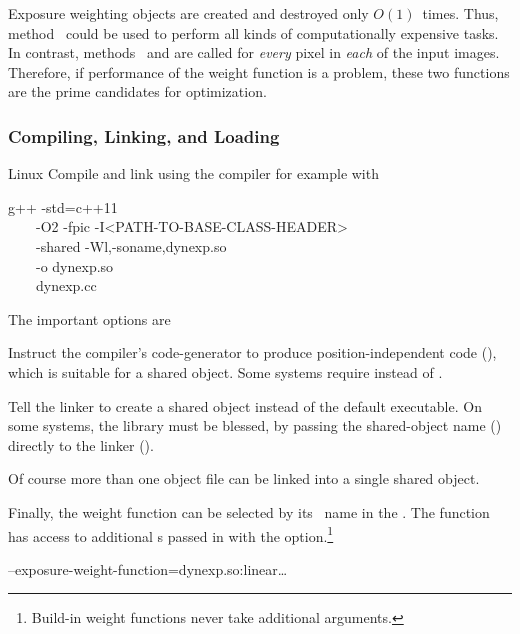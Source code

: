Exposure weighting objects are created and destroyed only $O(1)$~times.  Thus,
method~ could be used to perform all kinds of computationally expensive tasks.
In contrast, methods~ and  are called for \emph{every} pixel in
\emph{each} of the input images.  Therefore, if performance of the weight function is a problem,
these two functions are the prime candidates for optimization.


\subsubsection[Compiling, Linking, and Loading]{\label{sec:compiling-linking-loading}%
  Compiling, Linking, and Loading}

\begin{restrictedmaterial}{Linux}
  \noindent Compile and link using the  compiler for example with

  \begin{literal}
    g++ -std=c++11 \bslash \\
    ~~~~-O2 -fpic -I<PATH-TO-BASE-CLASS-HEADER> \bslash \\
    ~~~~-shared -Wl,-soname,dynexp.so \bslash \\
    ~~~~-o dynexp.so \bslash \\
    ~~~~dynexp.cc
  \end{literal}

  The important options are

  \begin{codelist}
  \item[\option{-fpic}]\itemend
    Instruct the compiler's code-generator to produce position\hyp{}independent code
    (), which is suitable for a shared object.  Some systems require 
    instead of .

  \item[\option{-shared}]\itemend
    Tell the linker to create a shared object instead of the default executable.  On some
    systems, the library must be blessed, by passing the shared-object name ()
    directly to the linker ().

    Of course more than one object file can be linked into a single shared object.
  \end{codelist}

  Finally, the weight function can be selected by its ~name in the
  .  The function has access to additional s passed in
  with the option.\footnote{Build-in weight functions never take additional arguments.}

  \begin{literal}
    \app{} --exposure-weight-function=dynexp.so:linear\dots
  \end{literal}
\end{restrictedmaterial}

